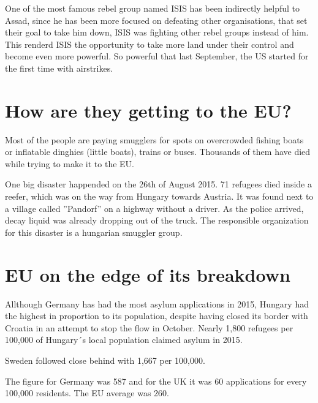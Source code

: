 One of the most famous rebel group named ISIS has been indirectly helpful to Assad, since he has been more focused on defeating other organisations, that set their goal to take him down, ISIS was fighting other rebel groups instead of him.
This renderd ISIS the opportunity to take more land under their control and become even more powerful. So powerful that last September, the US started for the first time with airstrikes.

\section{How are they getting to the EU?}
Most of the people are paying smugglers for spots on overcrowded fishing boats or inflatable dinghies (little boats), trains or buses. Thousands of them have died while trying to make it to the EU.

One big disaster happended on the 26th of August 2015. 71 refugees died inside a reefer, which was on the way from Hungary towards Austria. It was found next to a village called ''Pandorf'' on a highway without a driver. As the police arrived, decay liquid was already dropping out of the truck. The responsible organization for this disaster is a hungarian smuggler group.

\section{EU on the edge of its breakdown}
Allthough Germany has had the most asylum applications in 2015, Hungary had the highest in proportion to its population, despite having closed its border with Croatia in an attempt to stop the flow in October. Nearly 1,800 refugees per 100,000 of Hungary´s local population claimed asylum in 2015.

Sweden followed close behind with 1,667 per 100,000.

The figure for Germany was 587 and for the UK it was 60 applications for every 100,000 residents. The EU average was 260.


